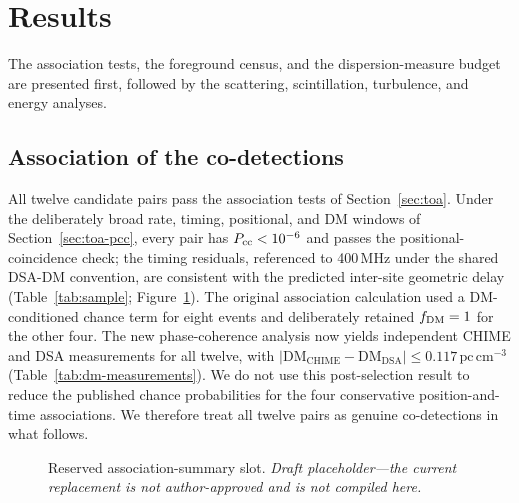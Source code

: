 \section{Results}
\label{sec:results}

The association tests, the foreground census, and the dispersion-measure
budget are presented first, followed by the scattering, scintillation,
turbulence, and energy analyses.

\FloatBarrier
\subsection{Association of the co-detections}
\label{sec:results-association}

All twelve candidate pairs pass the association tests of
Section~\ref{sec:toa}. Under the deliberately broad rate, timing, positional,
and DM windows of Section~\ref{sec:toa-pcc},
every pair has $P_{\rm cc}<10^{-6}$ and passes the
positional-coincidence check; the
timing residuals, referenced to
400\,MHz under the shared DSA-DM convention, are consistent with the
predicted inter-site geometric delay (Table~\ref{tab:sample};
Figure~\ref{fig:association-summary}). The original association calculation
used a DM-conditioned chance term for eight events and deliberately retained
$f_{\rm DM}=1$ for the other four. The new phase-coherence analysis now yields
independent CHIME and DSA measurements for all twelve, with
$|\mathrm{DM_{CHIME}}-\mathrm{DM_{DSA}}|\leq
0.117\,\mathrm{pc\,cm^{-3}}$ (Table~\ref{tab:dm-measurements}). We do not use
this post-selection result to reduce the published chance probabilities for
the four conservative position-and-time associations. We therefore treat all
twelve pairs as genuine co-detections in what follows.

\begin{figure}[t]
    \centering
    \caption{Reserved association-summary slot. \emph{Draft placeholder---the
    current replacement is not author-approved and is not compiled here.}}
    \label{fig:association-summary}
\end{figure}

